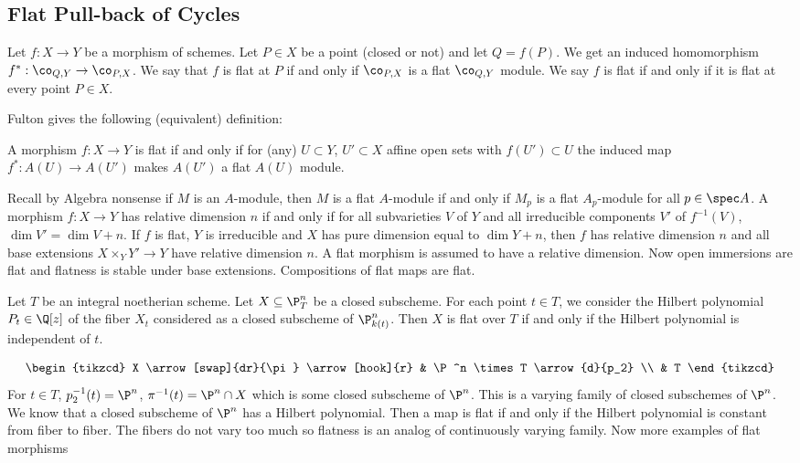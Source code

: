 \subsection{Flat Pull-back of Cycles}

\begin{dfn}[Flat]
Let $f: X \to Y$ be a morphism of schemes. Let $P \in X$ be a point (closed or not) and let $Q=f(P)$. We get an induced homomorphism $f^*: \co_{Q,Y} \to \co_{P,X}$. We say that $f$ is flat at $P$ if and only if $\co_{P,X}$ is a flat $\co_{Q,Y}$ module. We say $f$ is flat if and only if it is flat at every point $P \in X$. 
\end{dfn}

Fulton gives the following (equivalent) definition:

\begin{dfn}
A morphism $f: X \to Y$ is flat if and only if for (any) $U \subset Y$, $U' \subset X$ affine open sets with $f(U') \subset U$ the induced map $f^*: A(U) \to A(U')$ makes $A(U')$ a flat $A(U)$ module. 
\end{dfn}


Recall by Algebra nonsense if $M$ is an $A$-module, then $M$ is a flat $A$-module if and only if $M_p$ is a flat $A_p$-module for all $p \in \spec A$. A morphism $f: X \to Y$ has relative dimension $n$ if and only if for all subvarieties $V$ of $Y$ and all irreducible components $V'$ of $f^{-1}(V)$, $\dim V'=\dim V+n$. If $f$ is flat, $Y$ is irreducible and $X$ has pure dimension equal to $\dim Y+n$, then $f$ has relative dimension $n$ and all base extensions $X \times_Y Y' \to Y$ have relative dimension $n$. A flat morphism is assumed to have a relative dimension. Now open immersions are flat and flatness is stable under base extensions. Compositions of flat maps are flat. 


\begin{thmm}
Let $T$ be an integral noetherian scheme. Let $X \subseteq \P^n_T$ be a closed subscheme. For each point $t \in T$, we consider the Hilbert polynomial $P_t \in \Q[z]$ of the fiber $X_t$ considered as a closed subscheme of $\P^n_{k(t)}$. Then $X$ is flat over $T$ if and only if the Hilbert polynomial is independent of $t$. 
\end{thmm}
	\[
	\begin{tikzcd}
	X \arrow[swap]{dr}{\pi} \arrow[hook]{r} & \P^n \times T \arrow{d}{p_2} \\
	& T 
	\end{tikzcd}
	\]
For $t \in T$, $p_2^{-1}(t)=\P^n$, $\pi^{-1}(t)= \P^n \cap X$ which is some closed subscheme of $\P^n$. This is a varying family of closed subschemes of $\P^n$. We know that a closed subscheme of $\P^n$ has a Hilbert polynomial. Then a map is flat if and only if the Hilbert polynomial is constant from fiber to fiber. The fibers do not vary too much  so flatness is an analog of continuously varying family. Now more examples of flat morphisms

